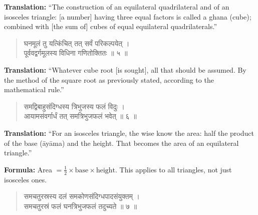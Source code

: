 \documentclass[11pt,a4paper]{article}
\newcommand{\dev}[1]{{\devanagarifont #1}}
\newenvironment{sanskritverse}{\begin{verse}\devanagarifont\large\centering}{\end{verse}}
\begin{document}
\vspace{0.3cm}
\noindent\textbf{Translation:} ``The construction of an equilateral quadrilateral and of an isosceles triangle: [a number] having three equal factors is called a ghana (cube); combined with [the sum of] cubes of equal equilateral quadrilaterals.''

\vspace{0.5cm}

\begin{tcolorbox}[colback=white,colframe=rulecolor,title={\dev{\textbf{गणित ५ — घनमूलम् (Cube Root)}}}]
\begin{sanskritverse}
\dev{घनमूलं तु यत्किंचित् तत् सर्वं परिकल्पयेत् ।\\
पूर्ववद्वर्गमूलस्य विधिना गणितोक्तितः ॥ ५ ॥}
\end{sanskritverse}
\end{tcolorbox}

\vspace{0.3cm}
\noindent\textbf{Translation:} ``Whatever cube root [is sought], all that should be assumed. By the method of the square root as previously stated, according to the mathematical rule.''

\vspace{0.5cm}

\begin{tcolorbox}[colback=white,colframe=rulecolor,title={\dev{\textbf{गणित ६ — त्रिभुजक्षेत्रफलम् (Area of a Triangle)}}}]
\begin{sanskritverse}
\dev{समद्विबाहुसंदिग्धस्य त्रिभुजस्य फलं विदुः ।\\
आयामसंवर्गार्धं तत् समत्रिभुजफलं भवेत् ॥ ६ ॥}
\end{sanskritverse}
\end{tcolorbox}

\vspace{0.3cm}
\noindent\textbf{Translation:} ``For an isosceles triangle, the wise know the area: half the product of the base (āyāma) and the height. That becomes the area of an equilateral triangle.''

\smallskip
\noindent\textbf{Formula:} Area $= \frac{1}{2} \times \text{base} \times \text{height}$. This applies to all triangles, not just isosceles ones.

\vspace{0.5cm}

\begin{tcolorbox}[colback=white,colframe=rulecolor,title={\dev{\textbf{गणित ७ — समचतुरस्रघनफलम् (Volume of a Pyramid/Prism)}}}]
\begin{sanskritverse}
\dev{समचतुरस्रस्य दलं समकोणसंदिग्धपादसंयुक्तम् ।\\
समचतुरस्रं फलं घनत्रिभुजफलं तदुच्यते ॥ ७ ॥}
\end{sanskritverse}
\end{tcolorbox}
\end{document}
